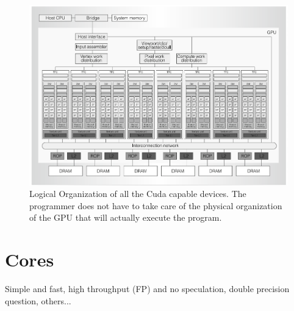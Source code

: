 \begin{figure}[h!bt]
	\centerline{\includegraphics[width=\textwidth]{img/NvidiaGPUsLogicalOrg.png}}
	\caption{Logical Organization of all the Cuda capable devices. The programmer does not have to take care of the physical organization of the GPU that will actually execute the program.}
	\label{fig:NvidiaGPUsLogicalOrg}
\end{figure}

\section{Cores}
Simple and fast, high throughput (FP) and no speculation, double precision question, others...\\

